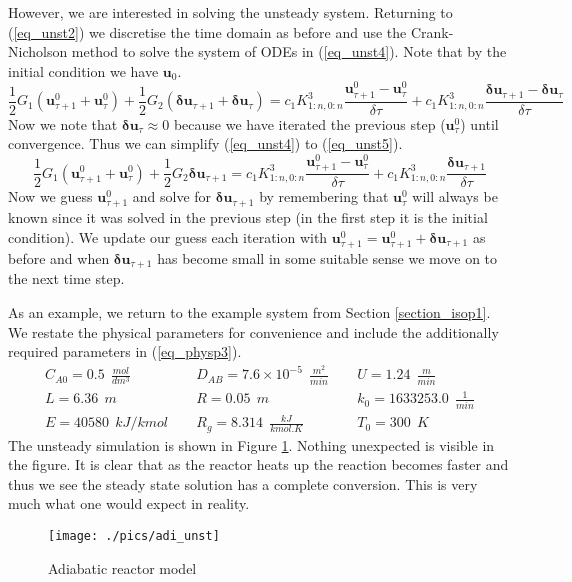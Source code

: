 \documentclass[11pt,fleqn]{article}
\theoremstyle{defstyle}
\begin{document}
However, we are interested in solving the unsteady system. Returning to (\ref{eq_unst2}) we discretise the time domain as before and use the Crank-Nicholson method to solve the system of ODEs in (\ref{eq_unst4}). Note that by the initial condition we have $\mathbf{u}_0$. 
\begin{equation}
\frac{1}{2} G_1\left(\mathbf{u}^0_{\tau+1}+\mathbf{u}^0_{\tau}\right) + \frac{1}{2}G_2\left(\mathbf{\delta u}_{\tau+1}+\mathbf{\delta u}_{\tau}\right) =c_1K^3_{1:n,0:n}\frac{\mathbf{u}^0_{\tau + 1}-\mathbf{u}^0_{\tau}}{\delta \tau} + c_1K^3_{1:n,0:n}\frac{\mathbf{\delta u}_{\tau + 1}-\mathbf{\delta u}_{\tau }}{\delta \tau}
\label{eq_unst4}
\end{equation}
Now we note that $\mathbf{\delta u}_{\tau} \approx 0$ because we have iterated the previous step ($\mathbf{u}^0_{\tau}$) until convergence. Thus we can simplify (\ref{eq_unst4}) to (\ref{eq_unst5}).
\begin{equation}
\frac{1}{2} G_1\left(\mathbf{u}^0_{\tau+1}+\mathbf{u}^0_{\tau}\right) + \frac{1}{2}G_2\mathbf{\delta u}_{\tau+1} =c_1K^3_{1:n,0:n}\frac{\mathbf{u}^0_{\tau + 1}-\mathbf{u}^0_{\tau}}{\delta \tau} + c_1K^3_{1:n,0:n}\frac{\mathbf{\delta u}_{\tau + 1}}{\delta \tau}
\label{eq_unst5}
\end{equation}
Now we guess $\mathbf{u}^0_{\tau+1}$ and solve for $\mathbf{\delta u}_{\tau+1}$ by remembering that $\mathbf{u}^0_{\tau}$ will always be known since it was solved in the previous step (in the first step it is the initial condition). We update our guess each iteration with  $\mathbf{u}^0_{\tau+1} = \mathbf{u}^0_{\tau+1} + \mathbf{\delta u}_{\tau+1}$ as before and when $\mathbf{\delta u}_{\tau+1}$ has become small in some suitable sense we move on to the next time step.

As an example, we return to the example system from Section \ref{section_isop1}. We restate the physical parameters for convenience and include the additionally required parameters in (\ref{eq_physp3}).
\begin{equation}
\begin{matrix}
C_{A0} = 0.5~~ \frac{mol}{dm^3} & \phantom{-}D_{AB} = 7.6\times 10^{-5} ~~\frac{m^2}{min} & \phantom{-}U = 1.24~~ \frac{m}{min} \\
L = 6.36~~ m 
& \phantom{-} R = 0.05~~ m
& \phantom{-} k_0 = 1633253.0 ~~ \frac{1}{min} \\
E = 40580 ~~ kJ/kmol
& \phantom{-} R_g = 8.314~~ \frac{kJ}{kmol. K}
& \phantom{-} T_0 = 300 ~~ K
\end{matrix} 
\label{eq_physp3}
\end{equation}
The unsteady simulation is shown in Figure \ref{fig_adi_unst}. Nothing unexpected is visible in the figure. It is clear that as the reactor heats up the reaction becomes faster and thus we see the steady state solution has a complete conversion. This is very much what one would expect in reality.
\begin{figure}[H] 
\centering
\texttt{[image: ./pics/adi\_unst]}
\caption{Adiabatic reactor model} 
\label{fig_adi_unst}
\end{figure}
\end{document}
